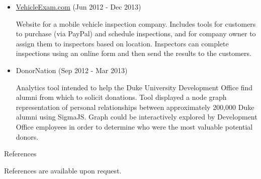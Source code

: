 \documentclass{article}
\begin{document}
    \begin{itemize}
        \item \href{http://vehicleexam.com}{VehicleExam.com}
        {
            \color{fade-gray}
            \small
            (Jun 2012 - Dec 2013)
        }

        Website for a mobile vehicle inspection company. Includes tools for customers to purchase (via PayPal) and schedule inspections, and for company owner to assign them to inspectors based on location. Inspectors can complete inspections using an online form and then send the results to the customers.

        \item DonorNation
        {
            \color{fade-gray}
            \small
            (Sep 2012 - Mar 2013)
        }

        Analytics tool intended to help the Duke University Development Office find alumni from which to solicit donations. Tool displayed a node graph representation of personal relationships between approximately 200,000 Duke alumni using SigmaJS. Graph could be interactively explored by Development Office employees in order to determine who were the most valuable potential donors.

    \end{itemize}



    \bigskip\bigskip\bigskip

    {
        \noindent\Large
        References
    }

    \noindent\makebox[\linewidth]{\rule{\textwidth}{0.4pt}}
    \medskip

    References are available upon request.
        
\end{document}
